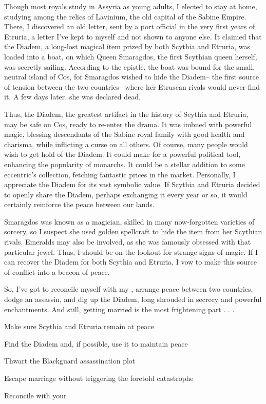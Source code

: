 \documentclass[char]{Kos}
\begin{document}
Though most royals study in Assyria as young adults, I elected to stay at home, studying among the relics of Lavinium, the old capital of the Sabine Empire. There, I discovered an old letter, sent by a port official in the very first years of Etruria, a letter I've kept to myself and not shown to anyone else. It claimed that the Diadem, a long-lost magical item prized by both Scythia and Etruria, was loaded into a boat, on which Queen Smaragdos, the first Scythian queen herself, was secretly sailing. According to the epistle, the boat was bound for the small, neutral island of Cos, for Smaragdos wished to hide the Diadem-- the first source of tension between the two countries-- where her Etruscan rivals would never find it. A few days later, she was declared dead.

Thus, the Diadem, the greatest artifact in the history of Scythia and Etruria, may be safe on Cos, ready to re-enter the drama. It was imbued with powerful magic, blessing descendants of the Sabine royal family with good health and charisma, while inflicting a curse on all others. Of course, many people would wish to get hold of the Diadem. It could make for a powerful political tool, enhancing the popularity of monarchs. It could be a stellar addition to some eccentric's collection, fetching fantastic prices in the market. Personally, I appreciate the Diadem for its vast symbolic value. If Scythia and Etruria decided to openly share the Diadem, perhaps exchanging it every year or so, it would certainly reinforce the peace between our lands.

Smaragdos was known as a magician, skilled in many now-forgotten varieties of sorcery, so I suspect she used golden spellcraft to hide the item from her Scythian rivals. Emeralds may also be involved, as she was famously obsessed with that particular jewel. Thus, I should be on the lookout for strange signs of magic. If I can recover the Diadem for both Scythia and Etruria, I vow to make this source of conflict into a beacon of peace. 

So, I've got to reconcile myself with my \cPoet{\sibling}, arrange peace between two countries, dodge an assassin, and dig up the Diadem, long shrouded in secrecy and powerful enchantments. And still, getting married is the most frightening part . . .

\begin{itemz}[Goals]
 \item Make sure Scythia and Etruria remain at peace
 \item Find the Diadem and, if possible, use it to maintain peace
 \item Thwart the Blackguard assassination plot 
 \item Escape marriage without triggering the foretold catastrophe
 \item Reconcile with your \cPoet{\sibling}
\end{itemz}

\end{document}
